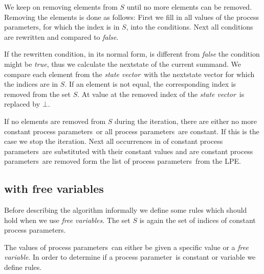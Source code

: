 \index{}\documentclass[a4paper,10pt]{article}
\theoremstyle{plain}
\theoremstyle{definition}
\newcommand{\pp}{process parameter}
\newcommand{\pps}{process parameters}
\newcommand{\ti}{\textit}
\newcommand{\sv}{\textit{state vector}}
\begin{document}
We keep on removing elements from $S$ until no more elements can be removed. Removing the elements is done as follows:
First we fill in all values of the \pps , for which the index is in $S$, into the conditions. Next all conditions are rewritten and compared to \ti{false}.

If the rewritten condition, in its normal form, is different from \ti{false} the condition might be \ti{true}, thus we calculate the nextstate of the current summand.  We compare each element from the \sv\ with the nextstate vector for which the indices are in $S$. If an element is not equal, the corresponding index is removed from the set $S$. 
At value at the removed index of the \sv\ is replaced by $\bot$. 

If no elements are removed from $S$ during the iteration, there are either no more constant \pps\ or all \pps\ are constant. If this is the case we stop the iteration. Next all occurrences in of constant \pps\ are substituted with their constant values and are constant \pps\ are removed form the list of \pps\ from the LPE. 

\subsection{with free variables}
Before describing the algorithm informally we define some rules which should hold when we use \ti{free variables}. The set  $S$ is again the set of indices of constant \pps .

The values of \pps\ can either be given a specific value or a \ti{free variable}. In order to determine if a \pp\ is constant or variable we define rules.
\end{document}
